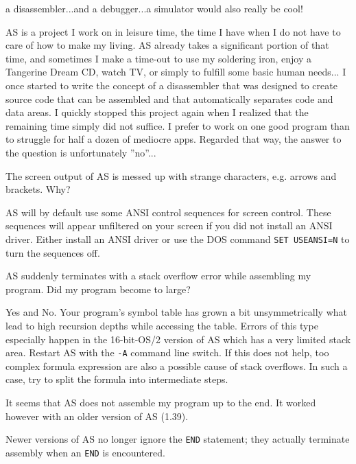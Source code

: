 \documentclass[12pt,twoside]{report}
\newcommand{\tty}[1]{{\tt #1}}
\begin{document}
\begin{description}
{   a disassembler...and a debugger...a simulator would also really be
   cool!}
\item[A:]{AS is a project I work on in leisure time, the time I have when I
   do not have to care of how to make my living.  AS already takes a
   significant portion of that time, and sometimes I make a time-out
   to use my soldering iron, enjoy a Tangerine Dream CD, watch TV, or
   simply to fulfill some basic human needs... I once started to
   write the concept of a disassembler that was designed to create
   source code that can be assembled and that automatically
   separates code and data areas.  I quickly stopped this project
   again when I realized that the remaining time simply did not
   suffice.  I prefer to work on one good program than to struggle for
   half a dozen of mediocre apps.  Regarded that way, the answer to
   the question is unfortunately ''no''...}
\vspace{0.3cm}
\item[Q:]{The screen output of AS is messed up with strange characters, e.g.
   arrows and brackets.  Why?}
\item[A:]{AS will by default use some ANSI control sequences for screen
   control.  These sequences will appear unfiltered on your screen
   if you did not install an ANSI driver.  Either install an ANSI
   driver or use the DOS command \tty{SET USEANSI=N} to turn the
   sequences off.}
\vspace{0.3cm}
\item[Q:]{AS suddenly terminates with a stack overflow error while
   assembling my program.  Did my program become to large?}
\item[A:]{Yes and No.  Your program's symbol table has grown a bit
   unsymmetrically what lead to high recursion depths while accessing
   the table.  Errors of this type especially happen in the
   16-bit-OS/2 version of AS which has a very limited stack area.
   Restart AS with the \tty{-A} command line switch.  If this does not
   help, too complex formula expression are also a possible cause of
   stack overflows.  In such a case, try to split the formula into
   intermediate steps.}
\vspace{0.3cm}
\item[Q:]{It seems that AS does not assemble my program up to the end.  It
   worked however with an older version of AS (1.39).}
\item[A:]{Newer versions of AS no longer ignore the \tty{END} statement; they
   actually terminate assembly when an \tty{END} is encountered. 
}
\end{description}
\end{document}
